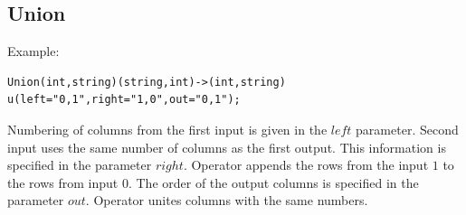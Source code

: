 \subsection{Union}
Example:
\begin{lstlisting}
Union(int,string)(string,int)->(int,string)
u(left="0,1",right="1,0",out="0,1");
\end{lstlisting}
Numbering of columns from the first input is given in the $left$ parameter. Second input uses the same number of columns as the first output. This information is specified in the parameter $right$. Operator appends the rows from the input $1$ to the rows from input $0$. The order of the output columns is specified in the parameter $out$. Operator unites columns with the same numbers.

